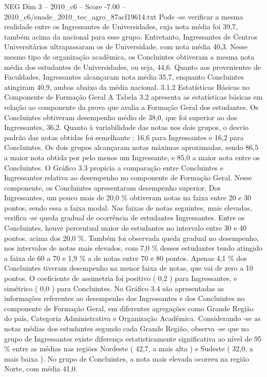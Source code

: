 \begin{textsample}{NEG Dim 3 – 2010\_c6 – Score -7.00 – 2010\_c6/enade\_2010\_tec\_agro\_87acf19614.txt}
Pode -se verificar a mesma realidade entre os Ingressantes de Universidades, cuja nota média foi 39,7, também acima da nacional para esse grupo.
Entretanto, Ingressantes de Centros Universitários ultrapassaram os de Universidade, com nota média 40,3.
Nesse mesmo tipo de organização acadêmica, os Concluintes obtiveram a mesma nota média dos estudantes de Universidades, ou seja, 44,6.
Quanto aos provenientes de Faculdades, Ingressantes alcançaram nota média 35,7, enquanto Concluintes atingiram 40,9, ambas abaixo da média nacional. 3.1.2 Estatísticas Básicas no Componente de Formação Geral A Tabela 3.2 apresenta as estatísticas básicas em relação ao componente da prova que avalia a Formação Geral dos estudantes.
Os Concluintes obtiveram desempenho médio de 38,0, que foi superior ao dos Ingressantes, 36,2.
Quanto à variabilidade das notas nos dois grupos, o desvio padrão das notas obtidas foi semelhante : 16,6 para Ingressantes e 16,2 para Concluintes.
Os dois grupos alcançaram notas máximas aproximadas, sendo 86,5 a maior nota obtida por pelo menos um Ingressante, e 85,0 a maior nota entre os Concluintes.
O Gráfico 3.3 propicia a comparação entre Concluintes e Ingressantes relativa ao desempenho no componente de Formação Geral.
Nesse componente, os Concluintes apresentaram desempenho superior.
Dos Ingressantes, um pouco mais de 20,0 \% obtiveram notas na faixa entre 20 e 30 pontos, sendo essa a faixa modal.
Nas faixas de notas seguintes, mais elevadas, verifica -se queda gradual de ocorrência de estudantes Ingressantes.
Entre os Concluintes, houve percentual maior de estudantes no intervalo entre 30 e 40 pontos, acima dos 20,0 \%.
Também foi observada queda gradual no desempenho, nos intervalos de notas mais elevados, com 7,0 \% desses estudantes tendo atingido a faixa de 60 a 70 e 1,9 \% a de notas entre 70 e 80 pontos.
Apenas 4,1 \% dos Concluintes tiveram desempenho na menor faixa de notas, que vai de zero a 10 pontos.
O coeficiente de assimetria foi positivo ( 0,2 ) para Ingressantes, e simétrico ( 0,0 ) para Concluintes.
No Gráfico 3.4 são apresentadas as informações referentes ao desempenho dos Ingressantes e dos Concluintes no componente de Formação Geral, em diferentes agregações como Grande Região do país, Categoria Administrativa e Organização Acadêmica.
Considerando -se as notas médias dos estudantes segundo cada Grande Região, observa -se que no grupo de Ingressantes existe diferença estatisticamente significativa ao nível de 95 \% entre as médias nas regiões Nordeste ( 42,7, a mais alta ) e Sudeste ( 32,0, a mais baixa ).
No grupo de Concluintes, a nota mais elevada ocorreu na região Norte, com média 41,0.

\end{textsample}
